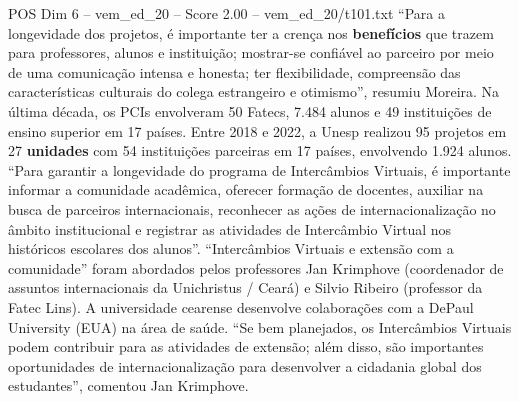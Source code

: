 \begin{textsample}{POS Dim 6 – vem\_ed\_20 – Score 2.00 – vem\_ed\_20/t101.txt}  \label{ex:f6_pos_031}
“Para a longevidade dos projetos, é importante ter a crença nos \textbf{benefícios} que trazem para professores, alunos e instituição; mostrar-se confiável ao parceiro por meio de uma comunicação intensa e honesta; ter flexibilidade, compreensão das características culturais do colega estrangeiro e otimismo”, resumiu Moreira.
Na última década, os PCIs envolveram 50 Fatecs, 7.484 alunos e 49 instituições de ensino superior em 17 países.
Entre 2018 e 2022, a Unesp realizou 95 projetos em 27 \textbf{unidades} com 54 instituições parceiras em 17 países, envolvendo 1.924 alunos. “Para garantir a longevidade do programa de Intercâmbios Virtuais, é importante informar a comunidade acadêmica, oferecer formação de docentes, auxiliar na busca de parceiros internacionais, reconhecer as ações de internacionalização no âmbito institucional e registrar as atividades de Intercâmbio Virtual nos históricos escolares dos alunos”. “Intercâmbios Virtuais e extensão com a comunidade” foram abordados pelos professores Jan Krimphove (coordenador de assuntos internacionais da Unichristus / Ceará) e Silvio Ribeiro (professor da Fatec Lins).
A universidade cearense desenvolve colaborações com a DePaul University (EUA) na área de saúde. “Se bem planejados, os Intercâmbios Virtuais podem contribuir para as atividades de extensão; além disso, são importantes oportunidades de internacionalização para desenvolver a cidadania global dos estudantes”, comentou Jan Krimphove.

\end{textsample}
